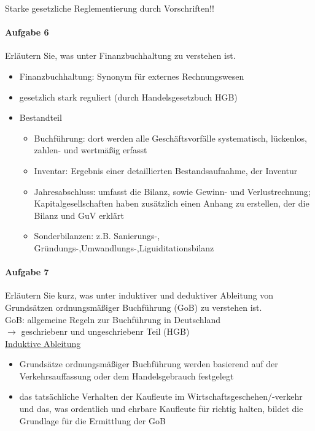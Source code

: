 \documentclass[paper=a4, fontsize=11pt]{scrartcl}
\numberwithin{equation}{section}
\numberwithin{figure}{section}
\numberwithin{table}{section}
\begin{document}
Starke gesetzliche Reglementierung durch Vorschriften!!

\paragraph{Aufgabe 6}
Erläutern Sie, was unter Finanzbuchhaltung zu verstehen ist. \\
\begin{itemize}
\item Finanzbuchhaltung: Synonym für externes Rechnungswesen 
\item gesetzlich stark reguliert (durch Handelsgesetzbuch HGB)
\item Bestandteil
 \begin{itemize}
 \item Buchführung: dort werden alle Geschäftsvorfälle systematisch, lückenlos, zahlen- und wertmäßig erfasst
 \item Inventar: Ergebnis einer detaillierten Bestandsaufnahme, der Inventur
 \item Jahresabschluss: umfasst die Bilanz, sowie Gewinn- und Verlustrechnung; Kapitalgesellschaften haben zusätzlich einen Anhang zu erstellen, der die Bilanz und GuV erklärt
 \item Sonderbilanzen: z.B. Sanierungs-, Gründungs-,Umwandlungs-,Liguiditationsbilanz
 \end{itemize}
\end{itemize}
\paragraph{Aufgabe 7}
Erläutern Sie kurz, was unter induktiver und deduktiver Ableitung von Grundsätzen ordnungsmäßiger Buchführung (GoB) zu verstehen ist. \\

GoB: allgemeine Regeln zur Buchführung in Deutschland \\
$\rightarrow$ geschriebenr und ungeschriebenr Teil (HGB) \\

\underline{Induktive Ableitung} 
\begin{itemize}
\item Grundsätze ordnungsmäßiger Buchführung werden basierend auf der Verkehrsauffassung oder dem Handelsgebrauch festgelegt
\item das tatsächliche Verhalten der Kaufleute im Wirtschaftsgeschehen/-verkehr und das, was ordentlich und ehrbare Kaufleute für richtig halten, bildet die Grundlage für die Ermittlung der GoB
\end{itemize}
\end{document}
